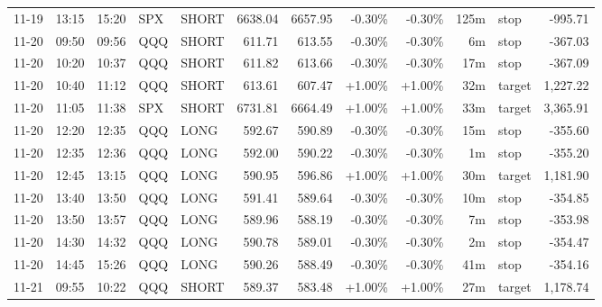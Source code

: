 \documentclass[11pt,a4paper,twoside]{article}
\begin{document}
\begin{center}
\begin{longtable}{>{\color{txtmain}}l l l l l r r r r r >{\color{txtmain}}l r}
11-19 & 13:15 & 15:20 & SPX & SHORT & 6638.04 & 6657.95 & \textcolor{lossred}{-0.30\%} & \textcolor{lossred}{-0.30\%} & 125m & stop & \textcolor{lossred}{-995.71} \\
11-20 & 09:50 & 09:56 & QQQ & SHORT & 611.71 & 613.55 & \textcolor{lossred}{-0.30\%} & \textcolor{lossred}{-0.30\%} & 6m & stop & \textcolor{lossred}{-367.03} \\
11-20 & 10:20 & 10:37 & QQQ & SHORT & 611.82 & 613.66 & \textcolor{lossred}{-0.30\%} & \textcolor{lossred}{-0.30\%} & 17m & stop & \textcolor{lossred}{-367.09} \\
11-20 & 10:40 & 11:12 & QQQ & SHORT & 613.61 & 607.47 & \textcolor{wingreen}{+1.00\%} & \textcolor{wingreen}{+1.00\%} & 32m & target & \textcolor{wingreen}{1,227.22} \\
11-20 & 11:05 & 11:38 & SPX & SHORT & 6731.81 & 6664.49 & \textcolor{wingreen}{+1.00\%} & \textcolor{wingreen}{+1.00\%} & 33m & target & \textcolor{wingreen}{3,365.91} \\
11-20 & 12:20 & 12:35 & QQQ & LONG & 592.67 & 590.89 & \textcolor{lossred}{-0.30\%} & \textcolor{lossred}{-0.30\%} & 15m & stop & \textcolor{lossred}{-355.60} \\
11-20 & 12:35 & 12:36 & QQQ & LONG & 592.00 & 590.22 & \textcolor{lossred}{-0.30\%} & \textcolor{lossred}{-0.30\%} & 1m & stop & \textcolor{lossred}{-355.20} \\
11-20 & 12:45 & 13:15 & QQQ & LONG & 590.95 & 596.86 & \textcolor{wingreen}{+1.00\%} & \textcolor{wingreen}{+1.00\%} & 30m & target & \textcolor{wingreen}{1,181.90} \\
11-20 & 13:40 & 13:50 & QQQ & LONG & 591.41 & 589.64 & \textcolor{lossred}{-0.30\%} & \textcolor{lossred}{-0.30\%} & 10m & stop & \textcolor{lossred}{-354.85} \\
11-20 & 13:50 & 13:57 & QQQ & LONG & 589.96 & 588.19 & \textcolor{lossred}{-0.30\%} & \textcolor{lossred}{-0.30\%} & 7m & stop & \textcolor{lossred}{-353.98} \\
11-20 & 14:30 & 14:32 & QQQ & LONG & 590.78 & 589.01 & \textcolor{lossred}{-0.30\%} & \textcolor{lossred}{-0.30\%} & 2m & stop & \textcolor{lossred}{-354.47} \\
11-20 & 14:45 & 15:26 & QQQ & LONG & 590.26 & 588.49 & \textcolor{lossred}{-0.30\%} & \textcolor{lossred}{-0.30\%} & 41m & stop & \textcolor{lossred}{-354.16} \\
11-21 & 09:55 & 10:22 & QQQ & SHORT & 589.37 & 583.48 & \textcolor{wingreen}{+1.00\%} & \textcolor{wingreen}{+1.00\%} & 27m & target & \textcolor{wingreen}{1,178.74} \\

\end{longtable}
\end{center}
\end{document}
